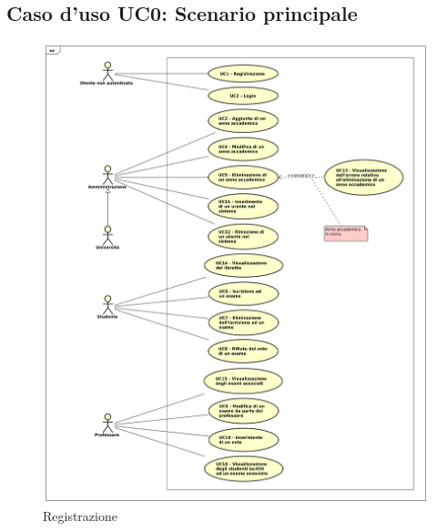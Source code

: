 \subsection{Caso d'uso \texorpdfstring{UC0}{UC0}: Scenario principale }
\begin{figure} [H]
	\centering
	\includegraphics[scale=0.4]{./img/UC0.pdf}
	\caption{Registrazione }\label{}
\end{figure}
